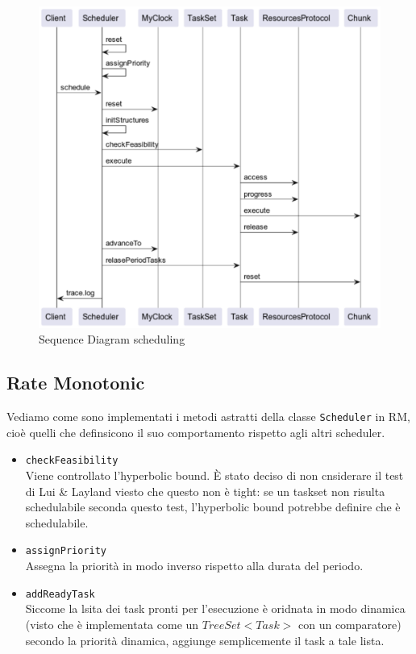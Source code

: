 \begin{figure}[htbp]
    \centering
    \includegraphics[width=.75\textwidth]{immagini/sequence diagram.pdf}
    \caption{Sequence Diagram scheduling}
    \label{fig:sequenceDiagram}
\end{figure}

\subsection{Rate Monotonic}
Vediamo come sono implementati i metodi astratti della classe \texttt{Scheduler} in RM, cioè quelli che definsicono il suo comportamento rispetto agli altri scheduler.
\begin{itemize}
    \item \texttt{checkFeasibility} \\
        Viene controllato l'hyperbolic bound. È stato deciso di non cnsiderare il test di Lui \& Layland viesto che questo non è tight: se un taskset non risulta schedulabile seconda questo test, l'hyperbolic bound potrebbe definire che è schedulabile.
    \item \texttt{assignPriority} \\
        Assegna la priorità in modo inverso rispetto alla durata del periodo.
    \item \texttt{addReadyTask} \\
        Siccome la lsita dei task pronti per l'esecuzione è oridnata in modo dinamica (visto che è implementata come un $TreeSet<Task>$ con un comparatore) secondo la priorità dinamica, aggiunge semplicemente il task a tale lista.
\end{itemize}

